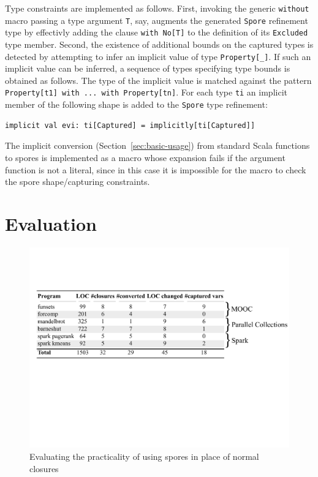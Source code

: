 \documentclass[runningheads]{llncs}
\begin{document}
\begin{sloppypar}
Type constraints are implemented as follows. First, invoking the generic \verb|without| macro passing a type argument \verb|T|, say, augments the generated \verb|Spore| refinement type by effectivly adding the clause \verb|with No[T]| to the definition of its \verb|Excluded| type member. Second, the existence of additional bounds on the captured types is detected by attempting to infer an implicit value of type \verb|Property[_]|. If such an implicit value can be inferred, a sequence of types specifying type bounds is obtained as follows. The type of the implicit value is matched against the pattern \verb|Property[t1] with ... with Property[tn]|. For each type \verb|ti| an implicit member of the following shape is added to the \verb|Spore| type refinement:

\begin{lstlisting}[numbers=none]
    implicit val evi: ti[Captured] = implicitly[ti[Captured]]
\end{lstlisting}
\noindent
The implicit conversion (Section~\ref{sec:basic-usage}) from standard Scala functions to spores is implemented as a macro whose expansion fails if the argument function is not a literal, since in this case it is impossible for the macro to check the spore shape/capturing constraints.



\section{Evaluation}
\label{sec:evaluation}

\begin{figure}[t!]
\centering
\includegraphics[width=\textwidth]{evaluation.pdf}
\caption{Evaluating the practicality of using spores in place of normal closures}
\label{fig:spore-eval}
\vspace{-5mm}
\end{figure}


\end{sloppypar}
\end{document}
